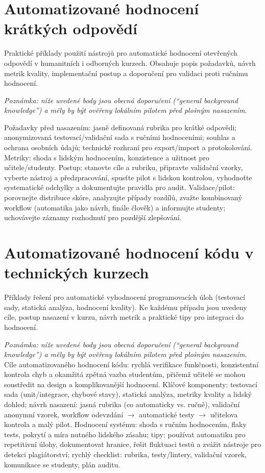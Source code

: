 \documentclass{report}%
\begin{document}
%
\section{Automatizované hodnocení krátkých odpovědí}%
Praktické příklady použití nástrojů pro automatické hodnocení otevřených odpovědí v humanitních i odborných kurzech. Obsahuje popis požadavků, návrh metrik kvality, implementační postup a doporučení pro validaci proti ručnímu hodnocení.%


%
\noindent\textit{Poznámka: níže uvedené body jsou obecná doporučení (``general background knowledge'') a měly by být ověřeny lokálním pilotem před plošným nasazením.}

\medskip

Požadavky před nasazením: jasně definovaná rubrika pro krátké odpovědi; anonymizovaná testovací/validační sada s ručními hodnoceními; souhlas a ochrana osobních údajů; technické rozhraní pro export/import a protokolování. Metriky: shoda s lidským hodnocením, konzistence a užitnost pro učitele/studenty. Postup: stanovte cíle a rubriku, připravte validační vzorky, vyberte nástroj a předzpracování, spusťte pilot s lidskou kontrolou, vyhodnoťte systematické odchylky a dokumentujte pravidla pro audit. Validace/pilot: porovnejte distribuce skóre, analyzujte případy rozdílů, zvažte kombinovaný workflow (automatika jako návrh, finále člověk) a informujte studenty; uchovávejte záznamy rozhodnutí pro pozdější zlepšování.%

%
\section{Automatizované hodnocení kódu v technických kurzech}%
Příklady řešení pro automatické vyhodnocení programovacích úloh (testovací sady, statická analýza, hodnocení kvality). Ke každému případu jsou uvedeny cíle, postup nasazení v kurzu, návrh metrik a praktické tipy pro integraci do hodnocení.%


%
\noindent\textit{Poznámka: níže uvedené body jsou obecná doporučení (``general background knowledge'') a měly by být ověřeny lokálním pilotem před plošným nasazením.}\medskip
Cíle automatizovaného hodnocení kódu: rychlá verifikace funkčnosti, konzistentní kontrola chyb a okamžitá zpětná vazba studentům, přičemž učitelé se mohou soustředit na design a komplikovanější hodnocení.
Klíčové komponenty: testovací sada (unit/integrace, chybové stavy), statická analýza, metriky kvality a lidský dohled; návrh nasazení: jasná rubrika (co automaticky vs. ručně), validační anonymní vzorek, workflow odevzdání \(\to\) automatické testy \(\to\) učitelova kontrola a malý pilot.
Hodnocení systému: shoda s ručním hodnocením, flaky tests, pokrytí a míra nutného lidského zásahu; tipy: používat automatiku pro repetitivní úlohy, dokumentovat hranice, řešit fluktuaci testů a zvážit nástroje pro detekci plagiátorství; rychlý checklist: rubrika, testy/lintery, validační vzorek, komunikace se studenty, plán auditu.%
\end{document}
